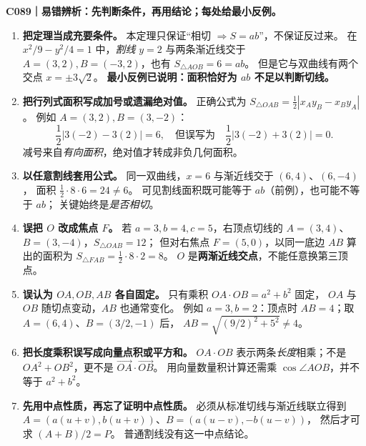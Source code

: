\clearpage
\begin{trapbox}
\textbf{C089｜易错辨析：先判断条件，再用结论；每处给最小反例。}

\begin{enumerate}
\item \textbf{把定理当成充要条件。}
本定理只保证``相切 $\Rightarrow S=ab$''，不保证反过来。
在 $x^2/9-y^2/4=1$ 中，\emph{割线} $y=2$ 与两条渐近线交于
$A=(3,2),B=(-3,2)$，也有 $S_{\triangle AOB}=6=ab$。
但是它与双曲线有两个交点 $x=\pm3\sqrt2$。
\textbf{最小反例已说明：面积恰好为 $ab$ 不足以判断切线。}


\item \textbf{把行列式面积写成加号或遗漏绝对值。}
正确公式为
$S_{\triangle OAB}=\frac12|x_Ay_B-x_By_A|$。
例如 $A=(3,2),B=(3,-2)$：
\[
\frac12|3(-2)-3(2)|=6,
\quad\text{但误写为}\quad\frac12|3(-2)+3(2)|=0.
\]
减号来自\emph{有向面积}，绝对值才转成非负几何面积。

\item \textbf{以任意割线套用公式。}
同一双曲线，$x=6$ 与渐近线交于 $(6,4)$、$(6,-4)$，
面积 $\frac12\cdot8\cdot6=24\ne6$。
可见割线面积既可能等于 $ab$（前例），也可能不等于 $ab$；
关键始终是\emph{是否相切}。
\begin{center}

\end{center}

\item \textbf{误把 $O$ 改成焦点 $F$。}
若 $a=3,b=4,c=5$，右顶点切线的
$A=(3,4)$、$B=(3,-4)$，$S_{\triangle OAB}=12$；
但对右焦点 $F=(5,0)$，以同一底边 $AB$ 算出的面积为
$S_{\triangle FAB}=\frac12\cdot8\cdot2=8$。
$O$ 是\textbf{两渐近线交点}，不能任意换第三顶点。
\begin{center}

\end{center}

\item \textbf{误认为 $OA,OB,AB$ 各自固定。}
只有乘积 $OA\cdot OB=a^2+b^2$ 固定，
$OA$ 与 $OB$ 随切点变动，$AB$ 也通常变化。
例如 $a=3,b=2$：顶点时 $AB=4$；取
$A=(6,4)$、$B=(3/2,-1)$ 后，
$AB=\sqrt{(9/2)^2+5^2}\ne4$。

\item \textbf{把长度乘积误写成向量点积或平方和。}
$OA\cdot OB$ 表示两条\emph{长度}相乘；不是
$OA^2+OB^2$，更不是 $\overrightarrow{OA}\cdot\overrightarrow{OB}$。
用向量数量积计算还需乘 $\cos\angle AOB$，并不等于 $a^2+b^2$。

\item \textbf{先用中点性质，再忘了证明中点性质。}
必须从标准切线与渐近线联立得到
$A=(a(u+v),b(u+v))$、$B=(a(u-v),-b(u-v))$，
然后才可求 $(A+B)/2=P$。
普通割线没有这一中点结论。


\end{enumerate}
\end{trapbox}

